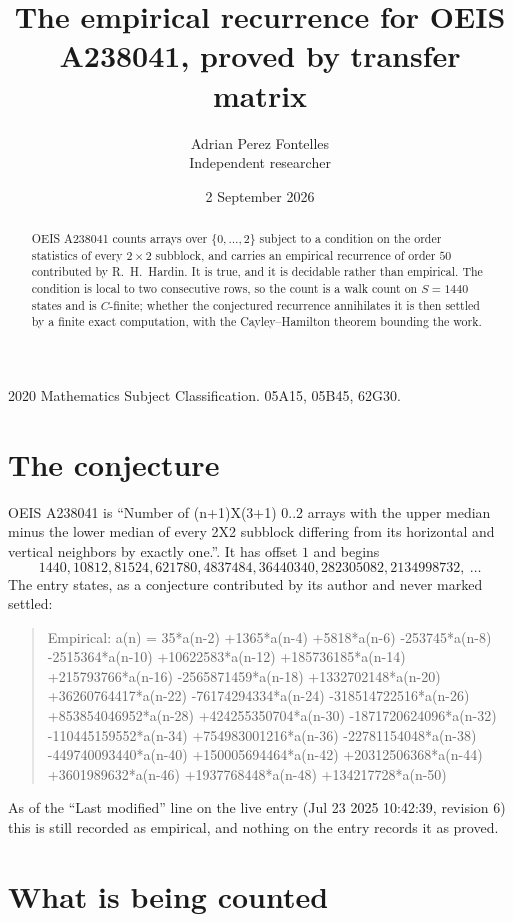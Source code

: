 \documentclass[11pt,a4paper]{article}
\title{The empirical recurrence for OEIS A238041, proved by transfer matrix}
\author{Adrian Perez Fontelles\\ \small Independent researcher}
\date{2 September 2026}
\theoremstyle{plain}
\theoremstyle{definition}
\begin{document}
\maketitle

\begin{abstract}
OEIS A238041 counts arrays over $\{0,\dots,2\}$ subject to a condition on the order
statistics of every $2\times2$ subblock, and carries an empirical recurrence of order
$50$ contributed by R.~H.~Hardin. It is true, and it is decidable rather than empirical.
The condition is local to two consecutive rows, so the count is a walk count on $S=1440$
states and is $C$-finite; whether the conjectured recurrence annihilates it is then settled by
a finite exact computation, with the Cayley--Hamilton theorem bounding the work.
\end{abstract}

\noindent\small 2020 Mathematics Subject Classification. 05A15, 05B45, 62G30.\normalsize

\section{The conjecture}

OEIS A238041 is ``Number of (n+1)X(3+1) 0..2 arrays with the upper median minus the lower median of every 2X2 subblock differing from its horizontal and vertical neighbors by exactly one.''. It has offset $1$ and begins
\[
1440, 10812, 81524, 621780, 4837484, 36440340, 282305082, 2134998732,\ \dots
\]
The entry states, as a conjecture contributed by its author and never marked settled:
\begin{quote}
Empirical: a(n) = 35*a(n-2) +1365*a(n-4) +5818*a(n-6) -253745*a(n-8) -2515364*a(n-10) +10622583*a(n-12) +185736185*a(n-14) +215793766*a(n-16) -2565871459*a(n-18) +1332702148*a(n-20) +36260764417*a(n-22) -76174294334*a(n-24) -318514722516*a(n-26) +853854046952*a(n-28) +424255350704*a(n-30) -1871720624096*a(n-32) -110445159552*a(n-34) +754983001216*a(n-36) -22781154048*a(n-38) -449740093440*a(n-40) +150005694464*a(n-42) +20312506368*a(n-44) +3601989632*a(n-46) +1937768448*a(n-48) +134217728*a(n-50)
\end{quote}
As of the ``Last modified'' line on the live entry (Jul 23 2025 10:42:39, revision 6) this is still
recorded as empirical, and nothing on the entry records it as proved.

\section{What is being counted}
\end{document}
